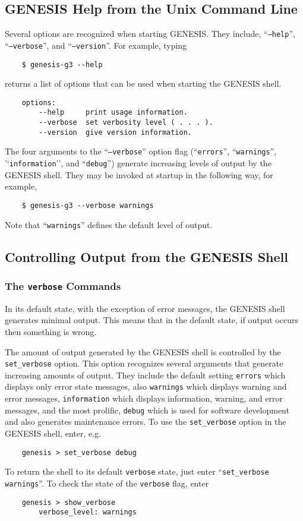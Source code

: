 \documentclass[12pt]{article}
\begin{document}
\subsection*{GENESIS Help from the Unix Command Line}
Several options are recognized when starting GENESIS. They include, ``{\tt --help}'', ``{\tt --verbose}'', and ``{\tt --version}''. For example, typing
\begin{verbatim}
    $ genesis-g3 --help
\end{verbatim}
returns a list of options that can be used when starting the GENESIS shell.
\begin{verbatim}
    options:
        --help     print usage information.
        --verbose  set verbosity level ( . . . ).
        --version  give version information.
\end{verbatim}
The four arguments to the ``{\tt --verbose}'' option flag (``{\tt errors}'', ``{\tt warnings}'', '`{\tt information}'', and ``{\tt debug}'') generate increasing levels of output by the GENESIS shell. They may be invoked at startup in the following way, for example,
\begin{verbatim}
    $ genesis-g3 --verbose warnings
\end{verbatim}
Note that ``{\tt warnings}'' defines the default level of output.

\subsection*{Controlling Output from the GENESIS Shell}

\subsubsection*{The {\tt verbose} Commands}

In its default state, with the exception of error messages, the GENESIS shell generates minimal output. This means that in the default state, if output occurs then something is wrong.

The amount of output generated by the GENESIS shell is controlled by the {\tt set\_verbose} option.  This option recognizes several arguments that generate increasing amounts of output. They include the default setting {\tt errors} which displays only error state messages, also {\tt warnings} which displays warning and error messages, {\tt information} which displays information, warning, and error messages, and the most prolific, {\tt debug} which is used for software development and also generates maintenance errors. To use the {\tt set\_verbose} option in the GENESIS shell, enter, e.g.
\begin{verbatim}
    genesis > set_verbose debug
\end{verbatim}
To return the shell to its default {\tt verbose} state, just enter ``{\tt set\_verbose warnings}''.  To check the state of the {\tt verbose} flag, enter
\begin{verbatim}
    genesis > show_verbose
        verbose_level: warnings
\end{verbatim}
\end{document}
